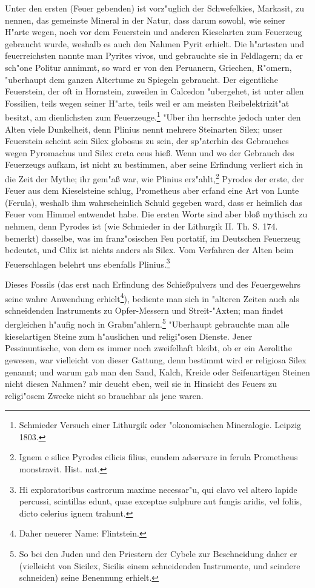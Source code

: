 \documentclass[a4paper, 11pt, oneside, polutonikogreek, german]{article}
\begin{document}
Unter den ersten (Feuer gebenden) ist vorz"uglich der Schwefelkies, Markasit, zu nennen, das gemeinste Mineral in der Natur, dass darum sowohl, wie seiner H"arte wegen, noch vor dem Feuerstein und anderen Kieselarten zum Feuerzeug gebraucht wurde, weshalb es auch den Nahmen Pyrit erhielt. Die h"artesten und feuerreichsten nannte man Pyrites vivos, und gebrauchte sie in Feldlagern; da er sch"one Politur annimmt, so ward er von den Peruanern, Griechen, R"omern, "uberhaupt dem ganzen Altertume zu Spiegeln gebraucht. Der eigentliche Feuerstein, der oft in Hornstein, zuweilen in Calcedon "ubergehet, ist unter allen Fossilien, teils wegen seiner H"arte, teils weil er am meisten Reibelektrizit"at besitzt, am dienlichsten zum Feuerzeuge.\footnote{Schmieder Versuch einer Lithurgik oder "okonomischen Mineralogie. Leipzig 1803.} "Uber ihn herrschte jedoch unter den Alten viele Dunkelheit, denn Plinius nennt mehrere Steinarten Silex; unser Feuerstein scheint sein Silex globosus zu sein, der sp"aterhin des Gebrauches wegen Pyromachus und Silex creta ceus hieß. Wenn und wo der Gebrauch des Feuerzeugs aufkam, ist nicht zu bestimmen, aber seine Erfindung verliert sich in die Zeit der Mythe; ihr gem"aß war, wie Plinius erz"ahlt,\footnote{Ignem e silice Pyrodes cilicis filius, eundem adservare in ferula Prometheus monstravit. Hist. nat.} Pyrodes der erste, der Feuer aus dem Kieselsteine schlug, Prometheus aber erfand eine Art von Lunte (Ferula), weshalb ihm wahrscheinlich Schuld gegeben ward, dass er heimlich das Feuer vom Himmel entwendet habe. Die ersten Worte sind aber bloß mythisch zu nehmen, denn Pyrodes ist (wie Schmieder in der Lithurgik II. Th. S. 174. bemerkt) dasselbe, was im franz"osischen Feu portatif, im Deutschen Feuerzeug bedeutet, und Cilix ist nichts anders als Silex. Vom Verfahren der Alten beim Feuerschlagen belehrt uns ebenfalls Plinius.\footnote{Hi exploratoribus castrorum maxime necessar"u, qui clavo vel altero lapide percussi, scintillas edunt, quae exceptae sulphure aut fungis aridis, vel foliis, dicto celerius ignem trahunt.}

Dieses Fossils (das erst nach Erfindung des Schießpulvers und des Feuergewehrs seine wahre Anwendung erhielt\footnote{Daher neuerer Name: Flintstein.}), bediente man sich in "alteren Zeiten auch als schneidenden Instruments zu Opfer-Messern und Streit-"Axten; man findet dergleichen h"aufig noch in Grabm"ahlern.\footnote{So bei den Juden und den Priestern der Cybele zur Beschneidung daher er (vielleicht von Sicilex, Sicilis einem schneidenden Instrumente, und scindere schneiden) seine Benennung erhielt.} "Uberhaupt gebrauchte man alle kieselartigen Steine zum h"auslichen und religi"osen Dienste. Jener Pessinuntische, von dem es immer noch zweifelhaft bleibt, ob er ein Aerolithe gewesen, war vielleicht von dieser Gattung, denn bestimmt wird er religiosa Silex genannt; und warum gab man den Sand, Kalch, Kreide oder Seifenartigen Steinen nicht diesen Nahmen? mir deucht eben, weil sie in Hinsicht des Feuers zu religi"osem Zwecke nicht so brauchbar als jene waren.
\end{document}
